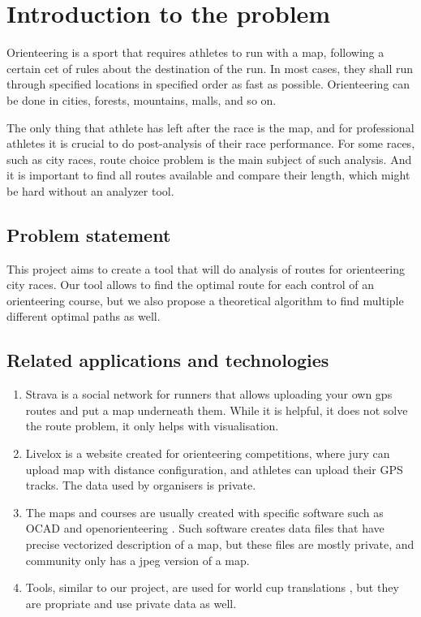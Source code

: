 \documentclass[a4paper,12pt]{extarticle}
\begin{document}
\section{Introduction to the problem}

Orienteering \cite{orienteering} is a sport that requires athletes to run with a map, following a certain cet of rules about the destination of the run.
In most cases, they shall run through specified locations in specified order as fast as possible.
Orienteering can be done in cities, forests, mountains, malls, and so on.

The only thing that athlete has left after the race is the map, and for professional athletes it is crucial to do post-analysis of their race performance.
For some races, such as city races, route choice problem is the main subject of such analysis.
And it is important to find all routes available and compare their length, which might be hard without an analyzer tool.

\subsection{Problem statement}

This project aims to create a tool that will do analysis of routes for orienteering city races.
Our tool allows to find the optimal route for each control of an orienteering course, but we also propose a theoretical
algorithm to find multiple different optimal paths as well.

\subsection{Related applications and technologies}

\begin{enumerate}
    \item Strava \cite{strava} is a social network for runners that allows uploading your own gps routes and put a map underneath them.
While it is helpful, it does not solve the route problem, it only helps with visualisation.
    \item Livelox \cite{livelox} is a website created for orienteering competitions, where jury can upload map with distance configuration, and athletes can upload their GPS tracks.
The data used by organisers is private. 
    \item The maps and courses are usually created with specific software such as OCAD \cite{ocad} and openorienteering \cite{openorienteering}. 
Such software creates data files that have precise vectorized description of a map, but these files are mostly private, and community only has a jpeg version of a map.
    \item Tools, similar to our project, are used for world cup translations \cite{worldcup}, but they are propriate and use private data as well.
\end{enumerate}
\end{document}

